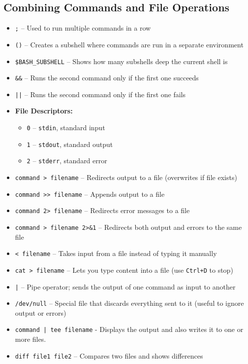 \documentclass[a4paper,12pt=]{article}
\begin{document}
\subsection{Combining Commands and File Operations}
    \begin{itemize}
        \item \texttt{;} – Used to run multiple commands in a row
        \item \texttt{()} – Creates a subshell where commands are run in a separate environment
        \item \texttt{\$BASH\_SUBSHELL} – Shows how many subshells deep the current shell is
    
        \item \texttt{\&\&} – Runs the second command only if the first one succeeds
        \item \texttt{||} – Runs the second command only if the first one fails
    
        \item \textbf{File Descriptors:}
        \begin{itemize}
            \item \texttt{0} – \texttt{stdin}, standard input
            \item \texttt{1} – \texttt{stdout}, standard output
            \item \texttt{2} – \texttt{stderr}, standard error
        \end{itemize}
    
        \item \texttt{command > filename} – Redirects output to a file (overwrites if file exists)
        \item \texttt{command >> filename} – Appends output to a file
        \item \texttt{command 2> filename} – Redirects error messages to a file
        \item \texttt{command > filename 2>\&1} – Redirects both output and errors to the same file
    
        \item \texttt{< filename} – Takes input from a file instead of typing it manually
        \item \texttt{cat > filename} – Lets you type content into a file (use \texttt{Ctrl+D} to stop)
    
        \item \texttt{|} – Pipe operator; sends the output of one command as input to another
    
        \item \texttt{/dev/null} – Special file that discards everything sent to it (useful to ignore output or errors)
    
        \item \texttt{command | tee filename} - Displays the output and also writes it to one or more files.
    
        \item \texttt{diff file1 file2} – Compares two files and shows differences
    \end{itemize}
\end{document}
